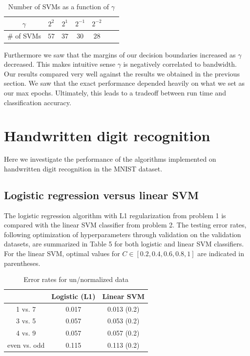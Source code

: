 \documentclass{article}
\begin{document}
\begin{table}
  \begin{center}
    \begin{tabular}{ | c | c | c | c | c | c | c |}
      \hline
       $\gamma$   & $2^2$       & $2^{1}$&  $2^{-1}$& $2^{-2}$\\ \hline
       \# of SVMs & $57$     & $37     $&  $30$     & $28$ \\ \hline

    \end{tabular}
  \end{center}
  \caption{Number of SVMs as a function of $\gamma$}
\end{table}
Furthermore we saw that the margins of our decision boundaries increased as $\gamma$ decreased. This makes intuitive sense $\gamma$ is negatively correlated to bandwidth. Our results compared very well against the results we obtained in the previous section. We saw that the exact performance depended heavily on what we set as our max epochs. Ultimately, this leads to a tradeoff between run time and classification accuracy.

\section{Handwritten digit recognition}
Here we investigate the performance of the algorithms implemented on handwritten digit recognition in the MNIST dataset.

\subsection{Logistic regression versus linear SVM}

The logistic regression algorithm with L1 regularization from problem 1 is compared with the linear SVM classifier from problem 2. The testing error rates, following optimization of hyperparameters through validation on the validation datasets, are summarized in Table 5 for both logistic and linear SVM classifiers. For the linear SVM, optimal values for $C \in [0.2, 0.4, 0.6, 0.8, 1]$ are indicated in parentheses.

\begin{table}
  \begin{center}
    \begin{tabular}{ | c | c | c | }
      \hline
                     & Logistic (L1)    & Linear SVM       \\ \hline
      1 vs. 7        & 0.017            & 0.013 (0.2)      \\ \hline
      3 vs. 5        & 0.057            & 0.053 (0.2)      \\ \hline
      4 vs. 9        & 0.057            & 0.057 (0.2)      \\ \hline
      even vs. odd   & 0.115            & 0.113 (0.2)      \\ \hline
    \end{tabular}
  \end{center}
  \caption{Error rates for un/normalized data}
\end{table}
\end{document}
